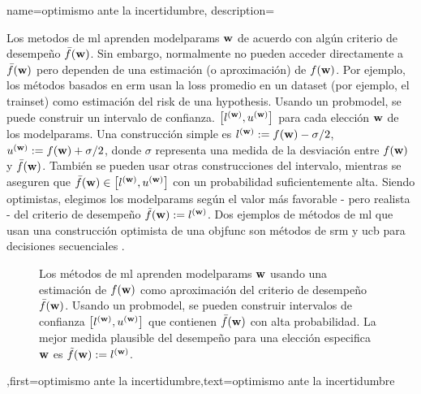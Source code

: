 {{
{name={optimismo ante la incertidumbre},
	description={Los metodos de \gls{ml} aprenden \gls{modelparams} ${\bf w}$ 
		de acuerdo con algún criterio de desempeño $\bar{f}({\bf w})$. Sin embargo, normalmente 
		no pueden acceder directamente a $\bar{f}({\bf w})$  pero dependen de una estimación (o aproximación) de $f({\bf w})$. 
		Por ejemplo, los métodos basados en \gls{erm} usan la \gls{loss} promedio en un \gls{dataset} (por ejemplo, el \gls{trainset}) 
		como estimación del \gls{risk} de una \gls{hypothesis}. Usando un \gls{probmodel}, se puede construir 
		un intervalo  de confianza. 
	$\big[ l^{({\bf w})},  u^{({\bf w})} \big]$ para cada elección ${\bf w}$ de los \gls{modelparams}.
	Una construcción simple es $l^{({\bf w})} := f({\bf w}) - \sigma/2$, $u^{({\bf w})} := f({\bf w})+ \sigma/2$, 
	donde $\sigma$ representa una medida de la desviación entre $f({\bf w})$ y $\bar{f}({\bf w})$. 
	También se pueden usar otras construcciones del intervalo, mientras se aseguren que $\bar{f}({\bf w}) \in\big[ l^{({\bf w})},  u^{({\bf w})} \big]$ 
	con un probabilidad suficientemente alta. Siendo optimistas, elegimos los \gls{modelparams} 
	según el valor más favorable - pero realista - del criterio de desempeño $\tilde{f}({\bf w}) :=  l^{({\bf w})}$. 
	Dos ejemplos de métodos de \gls{ml} que usan una construcción optimista de una \gls{objfunc} 
	son métodos de \gls{srm} \cite[Ch. 11]{ShalevMLBook} y \gls{ucb}  para decisiones secuenciales \cite[Sec. 2.2]{Bubeck2012}. 
		\begin{figure}[H]
				\begin{center}
\caption{Los métodos de \gls{ml} aprenden \gls{modelparams} ${\bf w}$ usando una estimación de $f({\bf w})$ como 
	aproximación del criterio de desempeño $\bar{f}({\bf w})$. Usando un \gls{probmodel}, se pueden construir intervalos de confianza $\big[ l^{({\bf w})},  u^{({\bf w})} \big]$ 
	que contienen $\bar{f}({\bf w})$ con alta probabilidad. La mejor medida plausible del desempeño para una elección especifica ${\bf w}$ es $\tilde{f}({\bf w}) := l^{({\bf w})}$.} 
	\end{center}
		\end{figure}},first={optimismo ante la incertidumbre},text={optimismo ante la incertidumbre} 
}

}}
